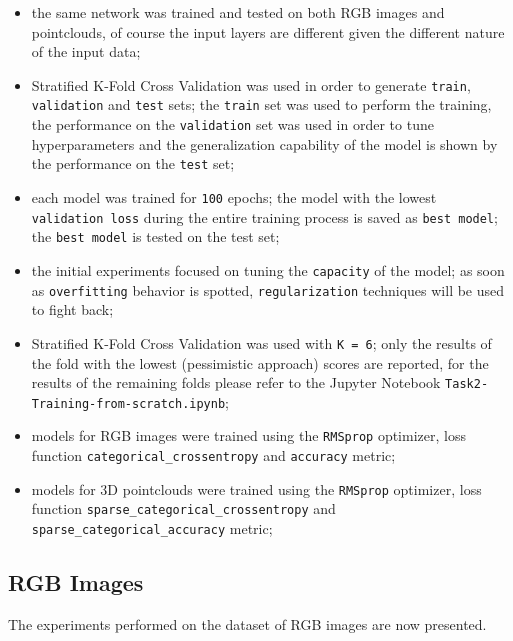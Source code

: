 \documentclass[11pt,a4paper]{article}
\begin{document}
\begin{itemize}
    \item the same network was trained and tested on both RGB images and pointclouds, of course the input layers are different given the different nature of the input data;
    \item Stratified K-Fold Cross Validation was used in order to generate \texttt{train}, \texttt{validation} and \texttt{test} sets; the \texttt{train} set was used to perform the training, the performance on the \texttt{validation} set was used in order to tune hyperparameters and the generalization capability of the model is shown by the performance on the \texttt{test} set;
    \item each model was trained for \texttt{100} epochs; the model with the lowest \texttt{validation loss} during the entire training process is saved as \texttt{best model}; the \texttt{best model} is tested on the test set;
    \item the initial experiments focused on tuning the \texttt{capacity} of the model; as soon as \texttt{overfitting} behavior is spotted, \texttt{regularization} techniques will be used to fight back;
    \item Stratified K-Fold Cross Validation was used with \texttt{K = 6}; only the results of the fold with the lowest (pessimistic approach) scores are reported, for the results of the remaining folds please refer to the Jupyter Notebook \texttt{Task2-Training-from-scratch.ipynb};
    \item models for RGB images were trained using the \texttt{RMSprop} optimizer, loss function \texttt{categorical\_crossentropy} and \texttt{accuracy} metric;
    \item models for 3D pointclouds were trained using the \texttt{RMSprop} optimizer, loss function \texttt{sparse\_categorical\_crossentropy} and \texttt{sparse\_categorical\_accuracy} metric;
\end{itemize}
\subsection{RGB Images}
The experiments performed on the dataset of RGB images are now presented.
\end{document}
